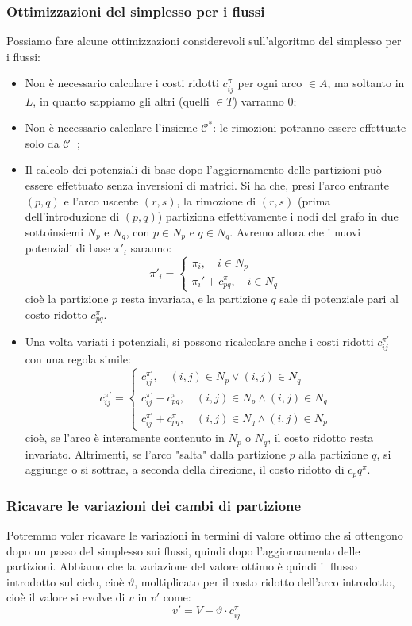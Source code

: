 \documentclass[a4paper,11pt]{article}
\begin{document}
\subsubsection{Ottimizzazioni del simplesso per i flussi}
Possiamo fare alcune ottimizzazioni considerevoli sull'algoritmo del simplesso per i flussi:
\begin{itemize}
	\item Non è necessario calcolare i costi ridotti $c^\pi_{ij}$ per ogni arco $\in A$, ma soltanto in $L$, in quanto sappiamo gli altri (quelli $\in T$) varranno 0;
	\item Non è necessario calcolare l'insieme $\mathcal{C}^*$: le rimozioni potranno essere effettuate solo da $\mathcal{C}^-$;
	\item Il calcolo dei potenziali di base dopo l'aggiornamento delle partizioni può essere effettuato senza inversioni di matrici.
		Si ha che, presi l'arco entrante $(p, q)$ e l'arco uscente $(r, s)$, la rimozione di $(r,s)$ (prima dell'introduzione di $(p,q)$) partiziona effettivamente i nodi del grafo in due sottoinsiemi $N_p$ e $N_q$, con $p \in N_p$ e $q \in N_q$.
		Avremo allora che i nuovi potenziali di base $\pi'_i$ saranno:
		\[
			\pi'_i =
			\begin{cases}
				\pi_i, \quad i \in N_p \\ 
				\pi_i'+ c_{pq}^\pi, \quad i \in N_q
			\end{cases}
		\]
		cioè la partizione $p$ resta invariata, e la partizione $q$ sale di potenziale pari al costo ridotto $c^\pi_{pq}$.
	\item Una volta variati i potenziali, si possono ricalcolare anche i costi ridotti $c_{ij}^{\pi'}$ con una regola simile:
		\[
			c_{ij}^{\pi'} =
			\begin{cases}
				c_{ij}^{\pi'}, \quad (i,j) \in N_p \vee (i,j) \in N_q \\ 
				c_{ij}^{\pi'} - c_{pq}^\pi, \quad (i,j) \in N_p \wedge (i,j) \in N_q \\ 
				c_{ij}^{\pi'} + c_{pq}^\pi, \quad (i,j) \in N_q \wedge (i,j) \in N_p
			\end{cases}
		\]
		cioè, se l'arco è interamente contenuto in $N_p$ o $N_q$, il costo ridotto resta invariato.
		Altrimenti, se l'arco "salta" dalla partizione $p$ alla partizione $q$, si aggiunge o si sottrae, a seconda della direzione, il costo ridotto di $c_pq^\pi$.
	\end{itemize}

\subsubsection{Ricavare le variazioni dei cambi di partizione}
Potremmo voler ricavare le variazioni in termini di valore ottimo che si ottengono dopo un passo del simplesso sui flussi, quindi dopo l'aggiornamento delle partizioni.
Abbiamo che la variazione del valore ottimo è quindi il flusso introdotto sul ciclo, cioè $\vartheta$, moltiplicato per il costo ridotto dell'arco introdotto, cioè il valore si evolve di $v$ in $v'$ come:
$$
v' = V - \vartheta \cdot c_{ij}^\pi
$$
\end{document}
